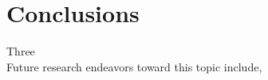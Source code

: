 \documentclass[conference]{IEEEtran}
\begin{document}
\section{Conclusions} \label{Conclusions}
Three \\
\indent
Future research endeavors toward this topic include, 

\end{document}
